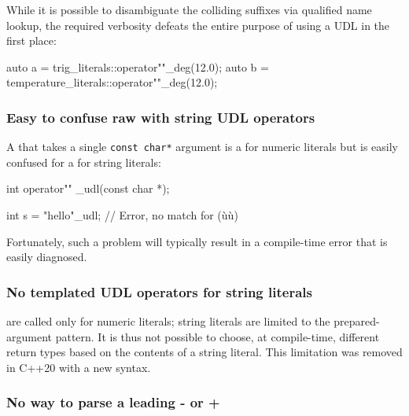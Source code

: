 \noindent While it is possible to disambiguate the colliding suffixes via qualified name lookup, the required verbosity defeats the entire purpose of using a UDL in the first place:

\begin{emcppslisting}[emcppsbatch=e25]
auto a = trig_literals::operator""_deg(12.0);
auto b = temperature_literals::operator""_deg(12.0);
\end{emcppslisting}
   

\subsubsection[Easy to confuse raw with string UDL operators]{Easy to confuse raw with string UDL operators}\label{easy-to-confuse-raw-with-string-udl-operators}

A  that takes a single
\lstinline!const!~\lstinline!char*! argument is a 
for numeric literals but is easily confused for a
 for string literals:

\begin{emcppslisting}
int operator"" _udl(const char *);

int s = "hello"_udl;  // Error, no match for (ù{}ù)
\end{emcppslisting}
    
\noindent Fortunately, such a problem will typically result in a compile-time
error that is easily \mbox{diagnosed}.

\subsubsection[No templated UDL operators for string literals]{No templated UDL operators for string literals}\label{no-templated-udl-operators-for-string-literals}

 are called only for numeric literals;
string literals are limited to the prepared-argument pattern. It is thus
not possible to choose, at compile-time, different return types based on
the contents of a string literal. This limitation was removed in
C++20 with a new syntax.

\subsubsection[No way to parse a leading \lstinline!-! or \lstinline!+!]{No way to parse a leading {\SubsubsecCode -} or {\SubsubsecCode +}}\label{no-way-to-parse-a-leading---or-+}

